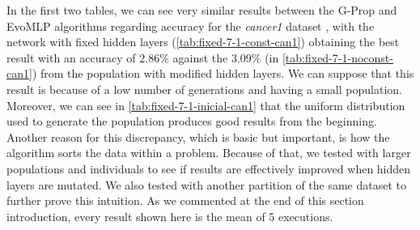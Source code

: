 \documentclass[conference]{IEEEtran}\usepackage[]{graphicx}\usepackage[]{color}
\begin{document}
In the first two tables, we can see very similar results between the G-Prop and
{\sf EvoMLP} algorithms regarding accuracy for
the \emph{cancer1} dataset \cite{uci}, with the network with fixed hidden layers
(\autoref{tab:fixed-7-1-const-can1}) obtaining the best result with an accuracy
of $2.86\%$ against the $3.09\%$ (in \autoref{tab:fixed-7-1-noconst-can1}) from
the population with modified hidden layers. We can suppose that this result is
because of a low number of generations and having a small population. Moreover,
we can see in \autoref{tab:fixed-7-1-inicial-can1} that the uniform
distribution used to generate the population produces good results from the
beginning. Another reason for this discrepancy, which is basic but important, is
how the algorithm sorts the data within a problem. Because of that, we tested
with larger populations and individuals to see if results are effectively
improved when hidden layers are mutated. We also tested with another partition
of the same dataset to further prove this intuition. %
As we commented at the end of this section introduction, every result shown
here is the mean of 5 executions. %
\end{document}
